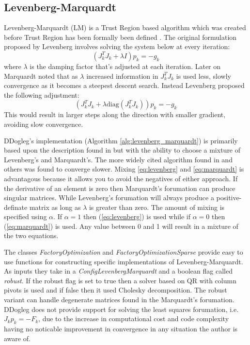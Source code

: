 \documentclass[peerreview,compsoc,onecolumn]{IEEEtran}
\begin{document}
\subsection{Levenberg-Marquardt}

Levenberg-Marquardt (LM) is a Trust Region based algorithm which was created before Trust Region has been formally been defined \cite{numopt2006,fletcher1987,dennis1996}. The original formulation proposed by Levenberg \cite{levenberg1944} involves solving the system below at every iteration:
\begin{equation}
\label{eq:levenberg}
(J_k^T J_k + \lambda I) p_k = -g_k
\end{equation} 
where $\lambda$ is the damping factor that's adjusted at each iteration. Later on Marquardt \cite{marquardt1963} noted that as $\lambda$ increased information in $J_k^T J_k$ is used less, slowly convergence as it becomes a steepest descent search. Instead Levenberg proposed the following adjustment:
\begin{equation}
\label{eq:marquardt}
(J_k^T J_k + \lambda \mbox{diag}(J_k^T J_k)) p_k = -g_k
\end{equation} 
This would result in larger steps along the direction with smaller gradient, avoiding slow convergence.

DDogleg's implementation (Algorithm \ref{alg:levenberg_marquardt}) is primarily based upon the description found in \cite{IMM2004} but with the ability to choose a mixture of Levenberg's and Marquardt's. The more widely cited algorithm found in \cite{fletcher1987} and others was found to converge slower. Mixing \ref{eq:levenberg} and \ref{eq:marquardt} is advantagous because it allows you to avoid the negatives of either approach. If the derivative of an element is zero then Marquardt's forumation can produce singular matrices. While Levenberg's forumation will always produce a positive-definate matrix as long as $\lambda$ is greater than zero. The amount of mixing is specified using $\alpha$. If $\alpha=1$ then (\ref{eq:levenberg}) is used while if $\alpha=0$ then (\ref{eq:marquardt}) is used. Any value between 0 and 1 will result in a mixture of the two equations.

The classes \emph{FactoryOptimization} and \emph{FactoryOptimizationSparse} provide easy to use functions for constructing specific implementations of Levenberg-Marquardt. As inputs they take in a \emph{ConfigLevenbergMarquardt} and a boolean flag called \emph{robust}. If the robust flag is set to true then a solver based on QR with column pivots is used and if false then it used Cholesky decomposition. The robust variant can handle degenerate matrices found in the Marquardt's forumation. DDogleg does not provide support for solving the least squares forumation, i.e. $J_k p_k = -F_k$, due to the increase in computational cost and code complexity having no noticable improvement in convergence in any situation the author is aware of.
\end{document}
